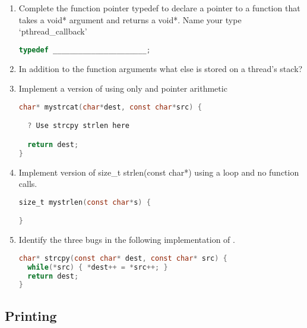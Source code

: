 \begin{enumerate}
\item Complete the function pointer typedef to declare a pointer to a function that takes a void* argument and returns a void*. Name your type `pthread\_callback'

\begin{lstlisting}[language=C]
typedef ______________________;
\end{lstlisting}

\item In addition to the function arguments what else is stored on a thread's stack?

\item Implement a version of  using only   and pointer arithmetic

\begin{lstlisting}[language=C]
char* mystrcat(char*dest, const char*src) {

  ? Use strcpy strlen here

  return dest;
}
\end{lstlisting}

\item Implement version of size\_t strlen(const char*) using a loop and no function calls.

\begin{lstlisting}[language=C]
size_t mystrlen(const char*s) {

}
\end{lstlisting}

\item Identify the three bugs in the following implementation of .

\begin{lstlisting}[language=C]
char* strcpy(const char* dest, const char* src) {
  while(*src) { *dest++ = *src++; }
  return dest;
}
\end{lstlisting}

\end{enumerate}

\subsection{Printing}

